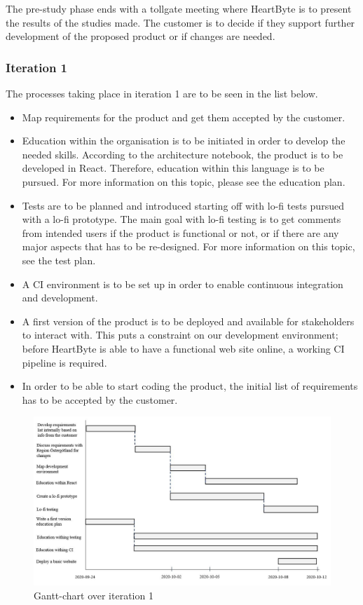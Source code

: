 The pre-study phase ends with a tollgate meeting where HeartByte is to present the results of the studies made. The customer is to decide if they support further development of the proposed product or if changes are needed.

\subsubsection{Iteration 1}
The processes taking place in iteration 1 are to be seen in the list below.
\begin{itemize}
    \item Map requirements for the product and get them accepted by the customer.
    \item Education within the organisation is to be initiated in order to develop the needed skills. According to the architecture notebook, the product is to be developed in React. Therefore, education within this language is to be pursued. For more information on this topic, please see the education plan. 
    \item Tests are to be planned and introduced starting off with lo-fi tests pursued with a lo-fi prototype.  The main goal with lo-fi testing is to get comments from intended users if the product is functional or not, or if there are any major aspects that has to be re-designed. For more information on this topic, see the test plan. 
     \item A CI environment is to be set up in order to enable continuous integration and development.
    \item A first version of the product is to be deployed and available for stakeholders to interact with. This puts a constraint on our development environment; before HeartByte is able to have a functional web site online, a working CI pipeline is required. 
    \item In order to be able to start coding the product, the initial list of requirements has to be accepted by the customer.
\end{itemize}


\begin{figure}[H]
\centering
\includegraphics[width=\linewidth]{Pictures/iteration_1.JPG}
\caption{Gantt-chart over iteration 1}
\label{fig:iteration_1}
\end{figure}
 

